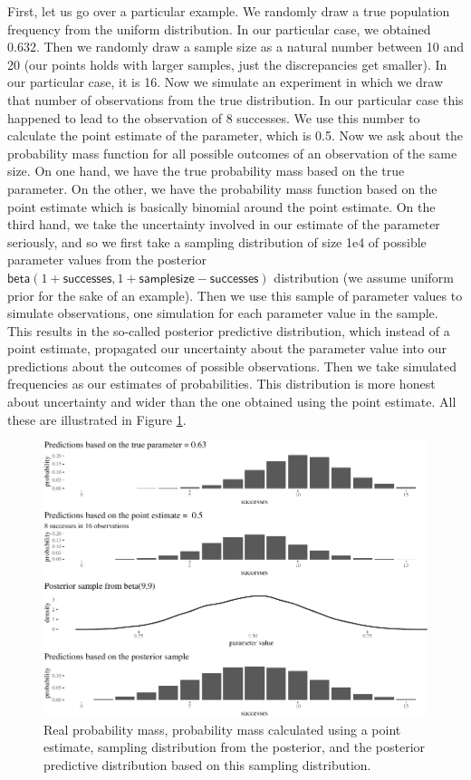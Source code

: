 \documentclass[
  10pt,
  dvipsnames,enabledeprecatedfontcommands]{scrartcl}
\newcommand{\s}[1]{\mbox{$\mathsf{#1}$}}
\begin{document}
First, let us go over a particular example. We randomly draw a true
population frequency from the uniform distribution. In our particular
case, we obtained 0.632. Then we randomly draw a sample size as a
natural number between 10 and 20 (our points holds with larger samples,
just the discrepancies get smaller). In our particular case, it is 16.
Now we simulate an experiment in which we draw that number of
observations from the true distribution. In our particular case this
happened to lead to the observation of 8 successes. We use this number
to calculate the point estimate of the parameter, which is 0.5. Now we
ask about the probability mass function for all possible outcomes of an
observation of the same size. On one hand, we have the true probability
mass based on the true parameter. On the other, we have the probability
mass function based on the point estimate which is basically binomial
around the point estimate. On the third hand, we take the uncertainty
involved in our estimate of the parameter seriously, and so we first
take a sampling distribution of size 1e4 of possible parameter values
from the posterior
\(\s{beta}(1+\s{successes}, 1+\s{sample size} - \s{successes})\)
distribution (we assume uniform prior for the sake of an example). Then
we use this sample of parameter values to simulate observations, one
simulation for each parameter value in the sample. This results in the
so-called posterior predictive distribution, which instead of a point
estimate, propagated our uncertainty about the parameter value into our
predictions about the outcomes of possible observations. Then we take
simulated frequencies as our estimates of probabilities. This
distribution is more honest about uncertainty and wider than the one
obtained using the point estimate. All these are illustrated in Figure
\ref{fig:posteriorPrediction}.

\begin{figure}[H]

\begin{center}\includegraphics[width=0.9\linewidth]{chapter-outline_files/figure-latex/fig:posteriorPrediction2-1} \end{center}


\caption{Real probability mass, probability mass calculated using a point estimate, sampling distribution from the posterior, and the posterior predictive distribution based on this sampling distribution.}
\label{fig:posteriorPrediction}
\end{figure}
\end{document}
